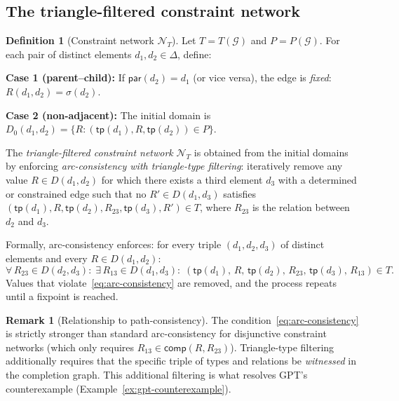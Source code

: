 \documentclass[a4paper,11pt]{article}
\theoremstyle{definition}
\newtheorem{definition}[theorem]{Definition}
\newtheorem{remark}[theorem]{Remark}
\newcommand{\comp}{\ensuremath{\mathsf{comp}}}
\begin{document}
\subsection{The triangle-filtered constraint network}

\begin{definition}[Constraint network $\mathcal{N}_T$]
\label{def:network}
Let $T = T(\mathcal{G})$ and $P = P(\mathcal{G})$.  For each pair
of distinct elements $d_1, d_2 \in \Delta$, define:

\medskip
\noindent\textbf{Case 1 (parent--child):}\;
If $\mathsf{par}(d_2) = d_1$ (or vice versa), the edge is
\emph{fixed}: $R(d_1, d_2) = \sigma(d_2)$.

\medskip
\noindent\textbf{Case 2 (non-adjacent):}\;
The initial domain is $D_0(d_1, d_2) = \{R : (\mathsf{tp}(d_1),
R, \mathsf{tp}(d_2)) \in P\}$.

\medskip
The \emph{triangle-filtered constraint network} $\mathcal{N}_T$ is
obtained from the initial domains by enforcing \emph{arc-consistency
with triangle-type filtering}: iteratively remove any value
$R \in D(d_1, d_2)$ for which there exists a third element $d_3$
with a determined or constrained edge such that no
$R' \in D(d_1, d_3)$ satisfies
$(\mathsf{tp}(d_1), R, \mathsf{tp}(d_2), R_{23}, \mathsf{tp}(d_3),
R') \in T$, where $R_{23}$ is the relation between $d_2$ and $d_3$.

Formally, arc-consistency enforces: for every triple $(d_1, d_2, d_3)$
of distinct elements and every $R \in D(d_1, d_2)$:
\begin{equation}
\label{eq:arc-consistency}
  \forall\, R_{23} \in D(d_2, d_3)\!:\;
  \exists\, R_{13} \in D(d_1, d_3)\!:\;
  (\mathsf{tp}(d_1),\, R,\, \mathsf{tp}(d_2),\, R_{23},\,
   \mathsf{tp}(d_3),\, R_{13}) \in T.
\end{equation}
Values that violate~\eqref{eq:arc-consistency} are removed, and the
process repeats until a fixpoint is reached.
\end{definition}

\begin{remark}[Relationship to path-consistency]
The condition~\eqref{eq:arc-consistency} is strictly stronger than
standard arc-consistency for disjunctive constraint networks (which
only requires $R_{13} \in \comp(R, R_{23})$).  Triangle-type filtering
additionally requires that the specific triple of types and relations
be \emph{witnessed} in the completion graph.  This additional
filtering is what resolves GPT's counterexample
(Example~\ref{ex:gpt-counterexample}).
\end{remark}
\end{document}
